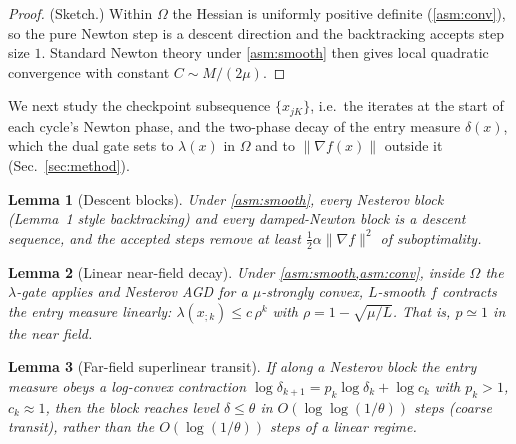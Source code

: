 \documentclass[11pt]{article}
\newtheorem{lemma}{Lemma}
\begin{document}
\begin{proof}
(Sketch.) Within $\Omega$ the Hessian is uniformly positive definite
(\cref{asm:conv}), so the pure Newton step is a descent direction and the backtracking
accepts step size $1$. Standard Newton theory under \cref{asm:smooth} then gives local
quadratic convergence with constant $C\sim M/(2\mu)$.
\end{proof}

We next study the checkpoint subsequence $\{x_{jK}\}$, i.e.\ the iterates at the
start of each cycle's Newton phase, and the two-phase decay of the entry
measure $\delta(x)$, which the dual gate sets to $\lambda(x)$ in $\Omega$ and to
$\|\nabla f(x)\|$ outside it (Sec.~\ref{sec:method}).

\begin{lemma}[Descent blocks]
\label{lem:descent}
Under \cref{asm:smooth}, every Nesterov block (Lemma~1 style backtracking) and
every damped-Newton block is a descent sequence, and the accepted steps remove
at least $\tfrac12\alpha\|\nabla f\|^2$ of suboptimality.
\end{lemma}

\begin{lemma}[Linear near-field decay]
\label{lem:linear}
Under \cref{asm:smooth,asm:conv}, inside $\Omega$ the $\lambda$-gate applies and
Nesterov AGD for a $\mu$-strongly convex, $L$-smooth $f$ contracts the entry
measure linearly:
$\lambda(x_{;k})\le c\,\rho^{k}$ with $\rho=1-\sqrt{\mu/L}$. That is,
$p\simeq1$ in the near field.
\end{lemma}

\begin{lemma}[Far-field superlinear transit]
\label{lem:far}
If along a Nesterov block the entry measure obeys a log-convex contraction
$\log\delta_{k+1}=p_k\log\delta_k+\log c_k$ with $p_k>1$, $c_k\approx1$, then the
block reaches level $\delta\le\theta$ in $O(\log\log(1/\theta))$ steps (coarse
transit), rather than the $O(\log(1/\theta))$ steps of a linear regime.
\end{lemma}
\end{document}
